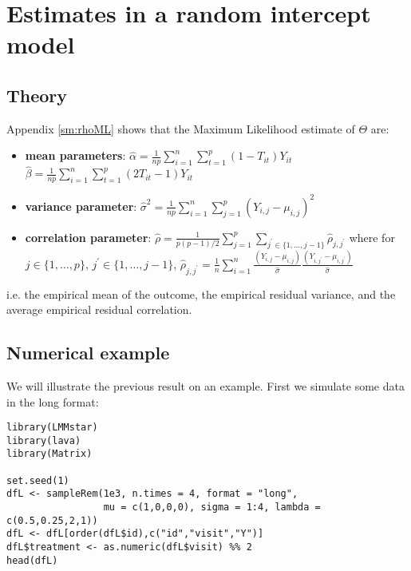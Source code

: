 \documentclass[12pt]{article}
\begin{document}
\clearpage

\section{Estimates in a random intercept model}
\label{sec:org2844b06}

\subsection{Theory}
\label{sec:org4251830}

Appendix \ref{sm:rhoML} shows that the Maximum Likelihood estimate of \(\Theta\) are:
\begin{itemize}
\item \textbf{mean parameters}: \(\widehat{\alpha}= \frac{1}{np} \sum_{i=1}^n
  \sum_{t=1}^p (1-T_{it}) Y_{it}\) \newline
{} \(\widehat{\beta}=
  \frac{1}{np} \sum_{i=1}^n \sum_{t=1}^p (2 T_{it}-1) Y_{it}\)
\item \textbf{variance parameter}: \(\widehat{\sigma}^2 =
  \frac{1}{np}\sum_{i=1}^n\sum_{j=1}^p (Y_{i,j}-\mu_{i,j})^2\)
\item \textbf{correlation parameter}: \(\widehat{\rho} =
  \frac{1}{p(p-1)/2}\sum_{j=1}^p \sum_{j^{\prime} \in
  \{1,\ldots,j-1\}}\widehat{\rho}_{j,j^{\prime}}\) \newline where for
\(j \in \{1,\ldots,p\}\), \(j^{\prime} \in \{1,\ldots,j-1\}\),
\(\widehat{\rho}_{j,j^{\prime}} = \frac{1}{n}\sum_{i=1}^n
  \frac{(Y_{i,j}-\mu_{i,j})}{\widehat{\sigma}}\frac{(Y_{i,j^{\prime}}-\mu_{i,j^{\prime}})}{\widehat{\sigma}}\)
\end{itemize}
i.e. the empirical mean of the outcome, the empirical residual
variance, and the average empirical residual correlation.

\subsection{Numerical example}
\label{sec:org5c55a9e}

We will illustrate the previous result on an example. First we
simulate some data in the long format:
\lstset{language=r,label= ,caption= ,captionpos=b,numbers=none}
\begin{lstlisting}
library(LMMstar)
library(lava)
library(Matrix)

set.seed(1)
dfL <- sampleRem(1e3, n.times = 4, format = "long",
                 mu = c(1,0,0,0), sigma = 1:4, lambda = c(0.5,0.25,2,1))
dfL <- dfL[order(dfL$id),c("id","visit","Y")]
dfL$treatment <- as.numeric(dfL$visit) %% 2
head(dfL)
\end{lstlisting}
\end{document}
